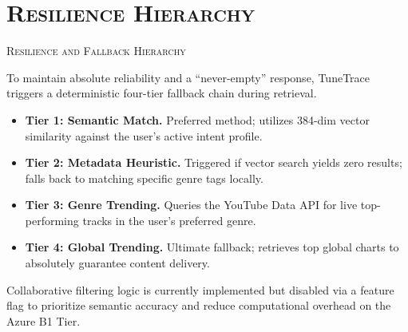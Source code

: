 \documentclass[xcolor=dvipsnames, aspectratio=1610]{beamer}
\begin{document}
\section{\textsc{Resilience Hierarchy}}
\begin{frame}{\textsc{Resilience and Fallback Hierarchy}}

  To maintain absolute reliability and a ``never-empty'' response, TuneTrace triggers a deterministic four-tier fallback chain during retrieval.

  \vspace{2.5mm}
  \begin{itemize}
    \item \textbf{Tier 1: Semantic Match.} Preferred method; utilizes 384-dim vector similarity against the user's active intent profile.
    \item \textbf{Tier 2: Metadata Heuristic.} Triggered if vector search yields zero results; falls back to matching specific genre tags locally.
    \item \textbf{Tier 3: Genre Trending.} Queries the YouTube Data API for live top-performing tracks in the user's preferred genre.
    \item \textbf{Tier 4: Global Trending.} Ultimate fallback; retrieves top global charts to absolutely guarantee content delivery.
  \end{itemize}

  \vspace{2.5mm}
  \begin{CommentBox}
    Collaborative filtering logic is currently implemented but disabled via a feature flag to prioritize semantic accuracy and reduce computational overhead on the Azure B1 Tier.
  \end{CommentBox}

\end{frame}

\end{document}
